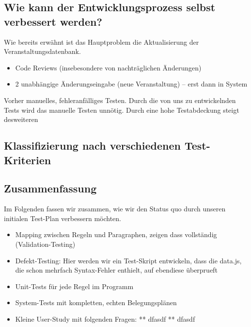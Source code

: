 \documentclass[ngerman]{article}
\begin{document}
\subsection{Wie kann der Entwicklungsprozess selbst verbessert werden?}

Wie bereits erwähnt ist das Hauptproblem die Aktualisierung der Veranstaltungsdatenbank.

\begin{itemize}
    \item
        Code Reviews (insebesondere von nachträglichen Änderungen)
    \item
        2 unabhängige Änderungseingabe (neue Veranstaltung) -- erst dann in System
\end{itemize}

Vorher manuelles, fehleranfälliges Testen. Durch die von uns zu
entwickelnden Tests wird das manuelle Testen unnötig. Durch eine hohe
Testabdeckung steigt desweiteren

\subsection{Klassifizierung nach verschiedenen Test-Kriterien}


\subsection{Zusammenfassung}
\label{sec:zusammenfassung}

Im Folgenden fassen wir zusammen, wie wir den Status quo durch unseren initialen Test-Plan verbessern möchten.

\begin{itemize}
    \item Mapping zwischen Regeln und Paragraphen, zeigen dass vollständig (Validation-Testing)
    \item
        Defekt-Testing: Hier werden wir ein Test-Skript entwickeln, dass die data.js, die schon mehrfach Syntax-Fehler enthielt, auf ebendiese überprueft
    \item
        Unit-Tests für jede Regel im Programm
    \item
        System-Tests mit kompletten, echten Belegungsplänen
    \item
        Kleine User-Study mit folgenden Fragen: ** dfasdf ** dfasdf
\end{itemize}

\end{document}
